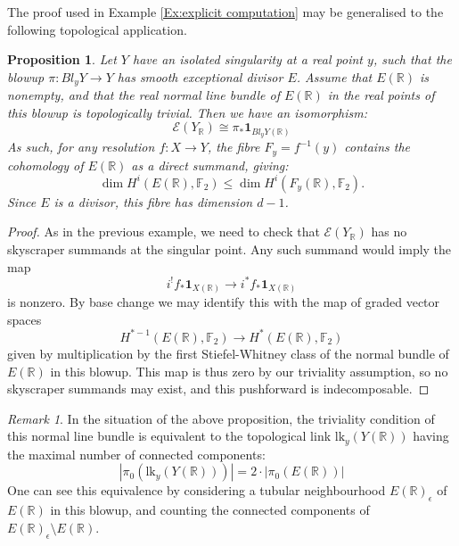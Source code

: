 \documentclass{amsart}
\newtheorem{prop}[thm]{Proposition}
\theoremstyle{definition}
\theoremstyle{remark}
\newtheorem{remark}[thm]{Remark}
\begin{document}
The proof used in Example \ref{Ex:explicit computation} may be generalised to the following topological application.

\begin{prop}\label{Prop:real blowup minimal}
    Let $Y$ have an isolated singularity at a real point $y$, such that the blowup $\pi:Bl_yY\to Y$ has smooth exceptional divisor $E$. Assume that $E(\mathbb{R})$ is nonempty, and that the real normal line bundle of $E(\mathbb{R})$ in the real points of this blowup is topologically trivial. Then we have an isomorphism: \[\mathscr{E}(Y_\mathbb{R})\cong \pi_*\mathbf{1}_{Bl_y Y(\mathbb{R})}\]
    As such, for any resolution $f:X\to Y$, the fibre $F_y=f^{-1}(y)$ contains the cohomology of $E(\mathbb{R})$ as a direct summand, giving:
    \[\dim H^i(E(\mathbb{R}),\mathbb{F}_2) \leq \dim H^i(F_y(\mathbb{R}),\mathbb{F}_2).\]
    Since $E$ is a divisor, this fibre has dimension $d-1$.
\end{prop}

\begin{proof}
As in the previous example, we need to check that $\mathscr{E}(Y_\mathbb{R})$ has no skyscraper summands at the singular point. Any such summand would imply the map \[i^!f_*\mathbf{1}_{X(\mathbb{R})}\to i^*f_*\mathbf{1}_{X(\mathbb{R})}\] is nonzero. By base change we may identify this with the map of graded vector spaces 
\[H^{*-1}(E(\mathbb{R}),\mathbb{F}_2)\to H^{*}(E(\mathbb{R}),\mathbb{F}_2)\]
given by multiplication by the first Stiefel-Whitney class of the normal bundle of $E(\mathbb{R})$ in this blowup. This map is thus zero by our triviality assumption, so no skyscraper summands may exist, and this pushforward is indecomposable.
\end{proof}

\begin{remark}
    In the situation of the above proposition, the triviality condition of this normal line bundle is equivalent to the topological link $\text{lk}_y(Y(\mathbb{R}))$ having the maximal number of connected components:
\[ |\pi_0(\text{lk}_y(Y(\mathbb{R})))|=2\cdot |\pi_0(E(\mathbb{R}))|\]
One can see this equivalence by considering a tubular neighbourhood $E(\mathbb{R})_\epsilon$ of $E(\mathbb{R})$ in this blowup, and counting the connected components of $E(\mathbb{R})_\epsilon\setminus E(\mathbb{R})$.
\end{remark}
\end{document}
